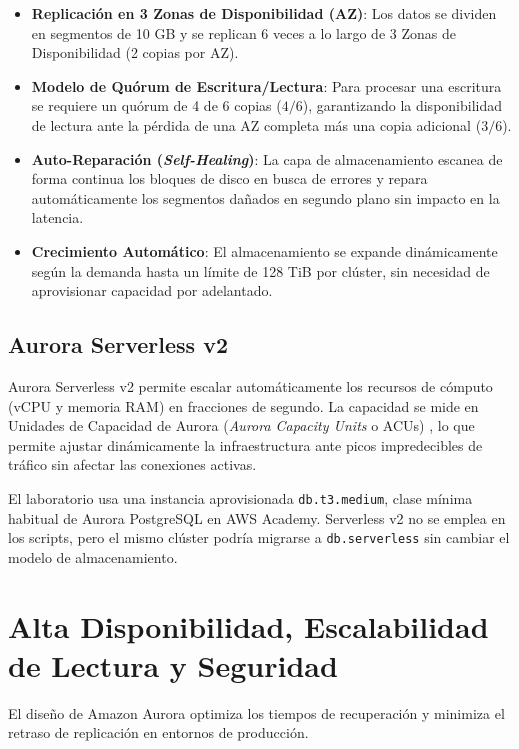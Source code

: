 \documentclass[12pt,a4paper]{article}
\begin{document}
\begin{itemize}
    \item \textbf{Replicación en 3 Zonas de Disponibilidad (AZ)}: Los datos se dividen en segmentos de 10 GB y se replican 6 veces a lo largo de 3 Zonas de Disponibilidad (2 copias por AZ).
    \item \textbf{Modelo de Quórum de Escritura/Lectura}: Para procesar una escritura se requiere un quórum de 4 de 6 copias ($4/6$), garantizando la disponibilidad de lectura ante la pérdida de una AZ completa más una copia adicional ($3/6$).
    \item \textbf{Auto-Reparación (\textit{Self-Healing})}: La capa de almacenamiento escanea de forma continua los bloques de disco en busca de errores y repara automáticamente los segmentos dañados en segundo plano sin impacto en la latencia.
    \item \textbf{Crecimiento Automático}: El almacenamiento se expande dinámicamente según la demanda hasta un límite de 128 TiB por clúster, sin necesidad de aprovisionar capacidad por adelantado.
\end{itemize}

\subsection{Aurora Serverless v2}

Aurora Serverless v2 permite escalar automáticamente los recursos de cómputo (vCPU y memoria RAM) en fracciones de segundo. La capacidad se mide en Unidades de Capacidad de Aurora (\textit{Aurora Capacity Units} o ACUs)%
, lo que permite ajustar dinámicamente la infraestructura ante picos impredecibles de tráfico sin afectar las conexiones activas.

El laboratorio usa una instancia aprovisionada \texttt{db.t3.medium}, clase mínima habitual de Aurora PostgreSQL en AWS Academy. Serverless v2 no se emplea en los scripts, pero el mismo clúster podría migrarse a \texttt{db.serverless} sin cambiar el modelo de almacenamiento.

\section{Alta Disponibilidad, Escalabilidad de Lectura y Seguridad}

El diseño de Amazon Aurora optimiza los tiempos de recuperación y minimiza el retraso de replicación en entornos de producción.
\end{document}
